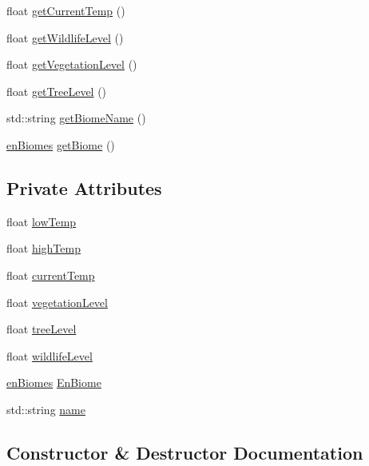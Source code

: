 \begin{DoxyCompactItemize}
float \mbox{\hyperlink{class_biome_ac347b6eeccd189054af58983acd62ea3}{get\+Current\+Temp}} ()
\item 
float \mbox{\hyperlink{class_biome_aaa9ebdc0dde9b6737da890299a7b5ea4}{get\+Wildlife\+Level}} ()
\item 
float \mbox{\hyperlink{class_biome_a93767d0c392cdef6c3c527a4dbe38efd}{get\+Vegetation\+Level}} ()
\item 
float \mbox{\hyperlink{class_biome_a052e0b1b6a6167f3e076a64a59487172}{get\+Tree\+Level}} ()
\item 
std\+::string \mbox{\hyperlink{class_biome_ad3cbf2a1fcdea543a2104fde28766f90}{get\+Biome\+Name}} ()
\item 
\mbox{\hyperlink{_enum_types_8hpp_a5c2255009cd01c90cf68245e6f453d1c}{en\+Biomes}} \mbox{\hyperlink{class_biome_aed98ff023d5563e1ca0309180064fbc4}{get\+Biome}} ()
\end{DoxyCompactItemize}
\subsection*{Private Attributes}
\begin{DoxyCompactItemize}
\item 
float \mbox{\hyperlink{class_biome_afe7165774528de18876c2df0b08faa9d}{low\+Temp}}
\item 
float \mbox{\hyperlink{class_biome_a389c810fbb09eea1fa5c4553ac976c77}{high\+Temp}}
\item 
float \mbox{\hyperlink{class_biome_a80ffc723aed56c5d9390a45e22a7742c}{current\+Temp}}
\item 
float \mbox{\hyperlink{class_biome_af2e689d891f991d1ec7abedb2d8cbfe6}{vegetation\+Level}}
\item 
float \mbox{\hyperlink{class_biome_aab11a193d913aeccf5a5d4d8af6ccd05}{tree\+Level}}
\item 
float \mbox{\hyperlink{class_biome_a4568b5f65ed8b774ef37d1126bb5ecd1}{wildlife\+Level}}
\item 
\mbox{\hyperlink{_enum_types_8hpp_a5c2255009cd01c90cf68245e6f453d1c}{en\+Biomes}} \mbox{\hyperlink{class_biome_a9171c1298078010a780475f5c0ab9d58}{En\+Biome}}
\item 
std\+::string \mbox{\hyperlink{class_biome_a45d0a14ac780f5a5a0215df8be24e8cf}{name}}
\end{DoxyCompactItemize}


\subsection{Constructor \& Destructor Documentation}
\mbox{\label{class_biome_aa340fc9737f1f60fe4aa99f5d4d5c726}} 
